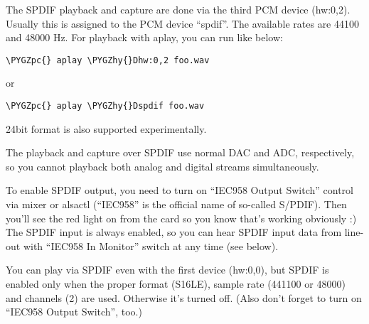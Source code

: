 \documentclass[a4paper,8pt,english]{sphinxmanual}
\def\PYGZpc{\char`\%}
\def\PYGZhy{\char`\-}
\begin{document}
The SPDIF playback and capture are done via the third PCM device
(hw:0,2).  Usually this is assigned to the PCM device ``spdif''.
The available rates are 44100 and 48000 Hz.
For playback with aplay, you can run like below:

\begin{Verbatim}[commandchars=\\\{\}]
\PYGZpc{} aplay \PYGZhy{}Dhw:0,2 foo.wav
\end{Verbatim}

or

\begin{Verbatim}[commandchars=\\\{\}]
\PYGZpc{} aplay \PYGZhy{}Dspdif foo.wav
\end{Verbatim}

24bit format is also supported experimentally.

The playback and capture over SPDIF use normal DAC and ADC,
respectively, so you cannot playback both analog and digital streams
simultaneously.

To enable SPDIF output, you need to turn on ``IEC958 Output Switch''
control via mixer or alsactl (``IEC958'' is the official name of
so-called S/PDIF).  Then you'll see the red light on from the card so
you know that's working obviously :)
The SPDIF input is always enabled, so you can hear SPDIF input data
from line-out with ``IEC958 In Monitor'' switch at any time (see
below).

You can play via SPDIF even with the first device (hw:0,0),
but SPDIF is enabled only when the proper format (S16LE), sample rate
(441100 or 48000) and channels (2) are used.  Otherwise it's turned
off.  (Also don't forget to turn on ``IEC958 Output Switch'', too.)
\end{document}
